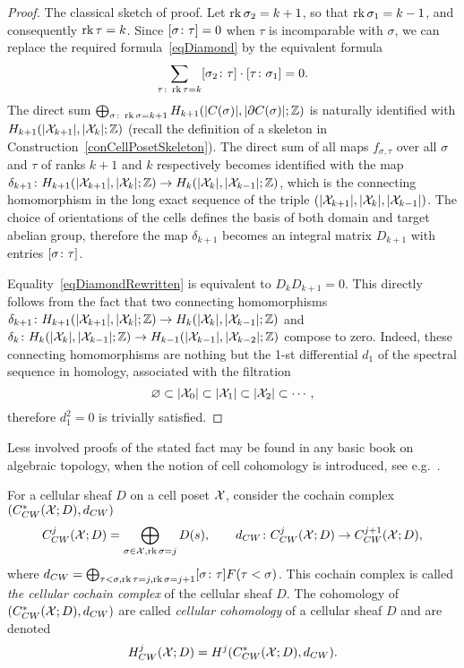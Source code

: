 \begin{proof}
The classical sketch of proof. Let $\operatorname{rk}\sigma_2=k+1$, so that $\operatorname{rk}\sigma_1=k-1$, and consequently $\operatorname{rk}\tau=k$. Since $[\sigma\colon \tau]=0$ when $\tau$ is incomparable with $\sigma$, we can replace the required formula~\eqref{eqDiamond} by the equivalent formula
\begin{equation}\label{eqDiamondRewritten}
\sum_{\tau\colon \operatorname{rk}\tau=k}[\sigma_2\colon \tau]\cdot[\tau\colon \sigma_1]=0.
\end{equation}
The direct sum $\bigoplus_{\sigma\colon \operatorname{rk}\sigma=k+1}H_{k+1}(|C(\sigma)|,|\partial C(\sigma)|;\mathbb{Z})$ is naturally identified with $H_{k+1}(|\mathcal{X}_{k+1}|,|\mathcal{X}_k|;\mathbb{Z})$ (recall the definition of a skeleton in Construction~\ref{conCellPosetSkeleton}). The direct sum of all maps $f_{\sigma,\tau}$ over all $\sigma$ and $\tau$ of ranks $k+1$ and $k$ respectively becomes identified with the map $\delta_{k+1}\colon H_{k+1}(|\mathcal{X}_{k+1}|,|\mathcal{X}_k|;\mathbb{Z})\to H_{k}(|\mathcal{X}_{k}|,|\mathcal{X}_{k-1}|;\mathbb{Z})$, which is the connecting homomorphism in the long exact sequence of the triple $(|\mathcal{X}_{k+1}|,|\mathcal{X}_{k}|,|\mathcal{X}_{k-1}|)$. The choice of orientations of the cells defines the basis of both domain and target abelian group, therefore the map $\delta_{k+1}$ becomes an integral matrix $D_{k+1}$ with entries $[\sigma\colon \tau]$.

Equality~\eqref{eqDiamondRewritten} is equivalent to $D_kD_{k+1}=0$. This directly follows from the fact that two connecting homomorphisms $\delta_{k+1}\colon H_{k+1}(|\mathcal{X}_{k+1}|,|\mathcal{X}_k|;\mathbb{Z})\to H_{k}(|\mathcal{X}_{k}|,|\mathcal{X}_{k-1}|;\mathbb{Z})$ and $\delta_{k}\colon H_{k}(|\mathcal{X}_{k}|,|\mathcal{X}_{k-1}|;\mathbb{Z})\to H_{k-1}(|\mathcal{X}_{k-1}|,|\mathcal{X}_{k-2}|;\mathbb{Z})$ compose to zero. Indeed, these connecting homomorphisms are nothing but the 1-st differential $d_1$ of the spectral sequence in homology, associated with the filtration
\[
\varnothing\subset |\mathcal{X}_0|\subset |\mathcal{X}_1|\subset|\mathcal{X}_2|\subset\cdots,
\]
therefore $d_1^2=0$ is trivially satisfied.
\end{proof}

Less involved proofs of the stated fact may be found in any basic book on algebraic topology, when the notion of cell cohomology is introduced, see e.g.~\cite[p.139]{Hatcher}.

\begin{defin}\label{definCWcochainComplex}
For a cellular sheaf $D$ on a cell poset $\mathcal{X}$, consider the cochain complex $(C^*_{CW}(\mathcal{X};D),d_{CW})$
\[
C^j_{CW}(\mathcal{X};D)=\bigoplus_{\sigma\in \mathcal{X}, \operatorname{rk}\sigma=j}D(s), \qquad d_{CW}\colon C^j_{CW}(\mathcal{X};D)\to C^{j+1}_{CW}(\mathcal{X};D),
\]
where $d_{CW}=\bigoplus_{\tau<\sigma, \operatorname{rk}\tau=j, \operatorname{rk}\sigma=j+1}[\sigma\colon \tau]F(\tau<\sigma)$. This cochain complex is called \emph{the cellular cochain complex} of the cellular sheaf $D$. The cohomology of $(C^*_{CW}(\mathcal{X};D),d_{CW})$ are called \emph{cellular cohomology} of a cellular sheaf $D$ and are denoted
\[
H^j_{CW}(\mathcal{X};D)=H^j(C^*_{CW}(\mathcal{X};D),d_{CW}).
\]
\end{defin}

